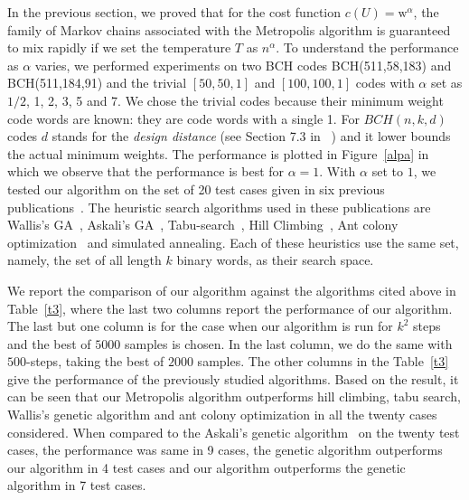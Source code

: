 \documentclass{sig-alternate-2013}
\begin{document}
In the previous section, we proved that for the cost function $c(U) =
\mathrm{w}^\alpha$, the family of Markov chains associated with
the Metropolis algorithm is guaranteed to mix rapidly if we set the
temperature $T$ as $n^\alpha$. To understand the performance as
$\alpha$ varies, we performed experiments on two BCH codes
BCH(511,58,183) and BCH(511,184,91) and the trivial $[50,50,1]$ and
$[100,100,1]$ codes with $\alpha$ set as $1/2$, 1, 2, 3, 5 and 7. We
chose the trivial codes because their minimum weight code words are
known: they are code words with a single 1. For $BCH(n, k, d)$ codes
$d$ stands for the \emph{design distance} (see Section 7.3 in ~\cite{bch-design-distance}) and it lower bounds the actual
minimum weights. The performance is plotted in Figure~\ref{alpa} in
which we observe that the performance is best for $\alpha =1$. With
$\alpha$ set to $1$, we tested our algorithm on the set of 20 test
cases given in six previous
publications~\cite{ref1,ref2,ref3,ref4,ant,sim}. The heuristic search
algorithms used in these publications are Wallis's
GA~\cite{ref1,ref2}, Askali's GA~\cite{ref1,ref4},
Tabu-search~\cite{ref1, ref2, ref3, ref4}, Hill
Climbing~\cite{ref1,ref2, ref4}, Ant colony optimization~\cite{ant}
and simulated annealing\cite{ant, sim}. Each of these heuristics use the
same set, namely, the set of all length $k$ binary words, as their
search space. 

We report the comparison of our algorithm against the algorithms cited
above in Table~\ref{t3}, where the last two columns report the
performance of our algorithm. The last but one column is for the case
when our algorithm is run for $k^2$ steps and the best of $5000$
samples is chosen. In the last column, we do the same with
$500$-steps, taking the best of $2000$ samples. The other columns in
the Table~\ref{t3} give the performance of the previously studied
algorithms.  Based on the result, it can be seen that our Metropolis
algorithm outperforms hill climbing, tabu search, Wallis's genetic
algorithm and ant colony optimization \cite{ref1,ref2,ref3,ref4,ant}
in all the twenty cases considered.  When compared to the Askali's
genetic algorithm~\cite{ref4, ref1} on the twenty test cases, the
performance was same in 9 cases, the genetic algorithm outperforms our
algorithm in 4 test cases and our algorithm outperforms the genetic
algorithm in 7 test cases.

\end{document}
